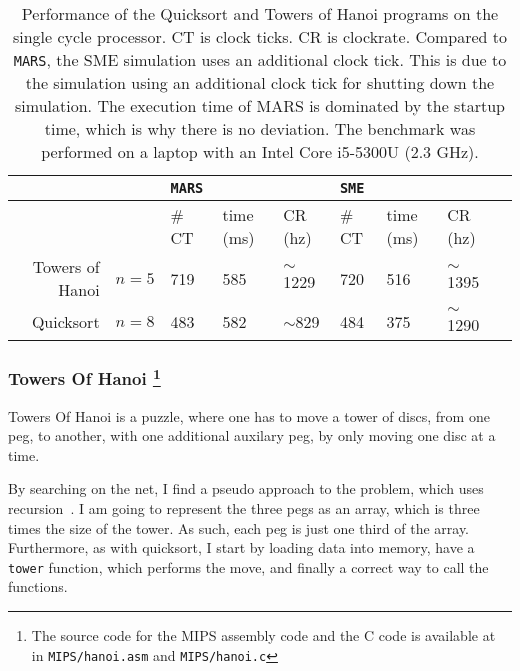 \begin{table}
    \centering
    \begin{adjustbox}{center}
    \begin{tabular}{rllllllll}
        & & \texttt{MARS} & & & \texttt{SME} \\
        \hline
        & & \# CT & time (ms) & CR (hz) & \# CT & time (ms) & CR (hz) \\
        \hline
        Towers of Hanoi & $n = 5$ & 719 & 585 & $\sim$1229 & 720 & 516 & $\sim$1395 \\
        Quicksort & $n = 8$ & 483 & 582 & $\sim$829 & 484 & 375 & $\sim$1290 \\
        \hline
    \end{tabular}
    \end{adjustbox}
    \caption{Performance of the Quicksort and Towers of Hanoi programs on the
    single cycle processor. CT is clock ticks. CR is clockrate. Compared to
    \texttt{MARS}, the SME simulation uses an additional clock tick. This is
    due to the simulation using an additional clock tick for shutting down the
    simulation. The execution time of MARS is dominated by the startup time,
    which is why there is no deviation. The benchmark was performed on a laptop
    with an Intel Core i5-5300U (2.3 GHz).}
    \label{tab:perf-single}
\end{table}

\subsubsection*{Towers Of Hanoi
\footnote{The source code for the MIPS assembly code and the C code is
available at~\cite{ref:github} in \texttt{MIPS/hanoi.asm} and
\texttt{MIPS/hanoi.c}}
}
Towers Of Hanoi is a puzzle, where one has to move a tower of discs, from one
peg, to another, with one additional auxilary peg, by only moving one disc at
a time.

By searching on the net, I find a pseudo approach to the problem, which uses
recursion~\cite{ref:hanoi}. I am going to represent the three pegs
as an array, which is three times the size of the tower. As such, each peg is
just one third of the array. Furthermore, as with quicksort, I start by
loading data into memory, have a \texttt{tower} function, which performs the
move, and finally a correct way to call the functions.

